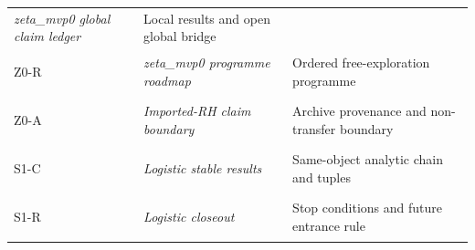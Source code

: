 \begin{longtable}[]{@{}lll@{}}
\begin{minipage}[t]{0.30\columnwidth}
\textit{zeta\_mvp0 global claim ledger}\strut
\end{minipage} & \begin{minipage}[t]{0.30\columnwidth}\raggedright
Local results and open global bridge\strut
\end{minipage}\tabularnewline
\begin{minipage}[t]{0.30\columnwidth}\raggedright
\hypertarget{record:Z0-R}{Z0-R}\strut
\end{minipage} & \begin{minipage}[t]{0.30\columnwidth}\raggedright
\textit{zeta\_mvp0 programme roadmap}\strut
\end{minipage} & \begin{minipage}[t]{0.30\columnwidth}\raggedright
Ordered free-exploration programme\strut
\end{minipage}\tabularnewline
\begin{minipage}[t]{0.30\columnwidth}\raggedright
\hypertarget{record:Z0-A}{Z0-A}\strut
\end{minipage} & \begin{minipage}[t]{0.30\columnwidth}\raggedright
\textit{Imported-RH claim boundary}\strut
\end{minipage} & \begin{minipage}[t]{0.30\columnwidth}\raggedright
Archive provenance and non-transfer boundary\strut
\end{minipage}\tabularnewline
\begin{minipage}[t]{0.30\columnwidth}\raggedright
\hypertarget{record:S1-C}{S1-C}\strut
\end{minipage} & \begin{minipage}[t]{0.30\columnwidth}\raggedright
\textit{Logistic stable results}\strut
\end{minipage} & \begin{minipage}[t]{0.30\columnwidth}\raggedright
Same-object analytic chain and tuples\strut
\end{minipage}\tabularnewline
\begin{minipage}[t]{0.30\columnwidth}\raggedright
\hypertarget{record:S1-R}{S1-R}\strut
\end{minipage} & \begin{minipage}[t]{0.30\columnwidth}\raggedright
\textit{Logistic closeout}\strut
\end{minipage} & \begin{minipage}[t]{0.30\columnwidth}\raggedright
Stop conditions and future entrance rule\strut
\end{minipage}\tabularnewline

\end{longtable}
